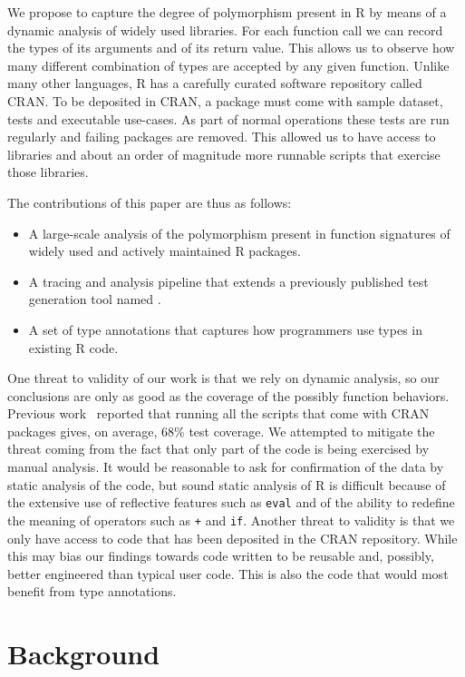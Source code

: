 \documentclass[acmsmall,review,anonymous]{acmart}\settopmatter{printfolios=true,printccs=false,printacmref=false}
\newcommand{\code}[1]{{\lstinline[style=Rin]!#1!}\xspace}
\begin{document}
We propose to capture the degree of polymorphism present in R by means
of a dynamic analysis of widely used libraries. For each function call we
can record the types of its arguments and of its return value. This allows
us to observe how many different combination of types are accepted by any
given function. Unlike many other languages, R has a carefully curated
software repository called CRAN. To be deposited in CRAN, a package must
come with sample dataset, tests and executable use-cases. As part of normal
operations these tests are run regularly and failing packages are removed.
This allowed us to have access to \PACKAGES libraries and about an order of
magnitude more runnable scripts that exercise those libraries.

The contributions of this paper are thus as follows:
\begin{itemize}
\item A large-scale analysis of the polymorphism present in function
  signatures of \PACKAGES widely used and actively maintained R packages.
\item A tracing and analysis pipeline that extends a previously published
  test generation tool named \genthat.
\item A set of type annotations that captures how programmers use types
in existing R code.
\end{itemize}

One threat to validity of our work is that we rely on dynamic analysis, so
our conclusions are only as good as the coverage of the possibly function
behaviors. Previous work~\cite{issta18} reported that running all the
scripts that come with CRAN packages gives, on average, 68\% test coverage.
We attempted to mitigate the threat coming from the fact that only part of
the code is being exercised by manual analysis. It would be reasonable to
ask for confirmation of the data by static analysis of the code, but sound
static analysis of R is difficult because of the extensive use of reflective
features such as \code{eval} and of the ability to redefine the meaning of
operators such as \code{+} and \code{if}.  Another threat to validity is
that we only have access to code that has been deposited in the CRAN
repository. While this may bias our findings towards code written to be
reusable and, possibly, better engineered than typical user code. This is
also the code that would most benefit from type annotations.

%
\section{Background} %
\end{document}
